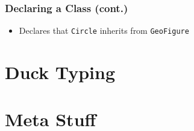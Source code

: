 \documentclass{beamer}
\begin{document}
\begin{frame}[t,fragile]
  \frametitle{Declaring a Class (cont.)}
  \begin{example}
    \begin{semiverbatim}
    \end{semiverbatim}
  \end{example}

  \begin{itemize}
    \item<2> Declares that \texttt{Circle} inherits from \texttt{GeoFigure}
  \end{itemize}
\end{frame}

\section{Duck Typing}
\begin{frame}
\end{frame}

\section{Meta Stuff}
\begin{frame}
\end{frame}
\end{document}

